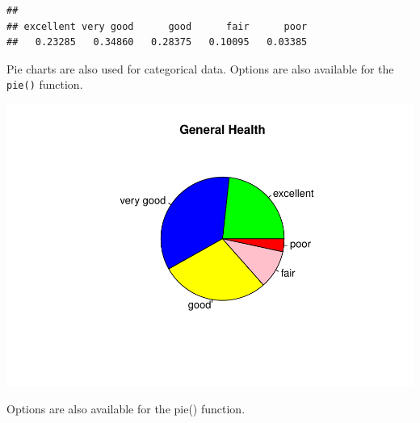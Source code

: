 \documentclass[
]{book}
\newenvironment{Shaded}{\begin{snugshade}}{\end{snugshade}}
\newcommand{\DataTypeTok}[1]{\textcolor[rgb]{0.13,0.29,0.53}{#1}}
\newcommand{\DecValTok}[1]{\textcolor[rgb]{0.00,0.00,0.81}{#1}}
\newcommand{\KeywordTok}[1]{\textcolor[rgb]{0.13,0.29,0.53}{\textbf{#1}}}
\newcommand{\NormalTok}[1]{#1}
\newcommand{\OperatorTok}[1]{\textcolor[rgb]{0.81,0.36,0.00}{\textbf{#1}}}
\newcommand{\StringTok}[1]{\textcolor[rgb]{0.31,0.60,0.02}{#1}}
\begin{document}
\begin{verbatim}
## 
## excellent very good      good      fair      poor 
##   0.23285   0.34860   0.28375   0.10095   0.03385
\end{verbatim}

Pie charts are also used for categorical data. Options are also available for the \texttt{pie()} function.

\begin{Shaded}
\end{Shaded}

\includegraphics{_main_files/figure-latex/unnamed-chunk-182-1.pdf}

Options are also available for the pie() function.

\begin{Shaded}
\end{Shaded}
\end{document}
